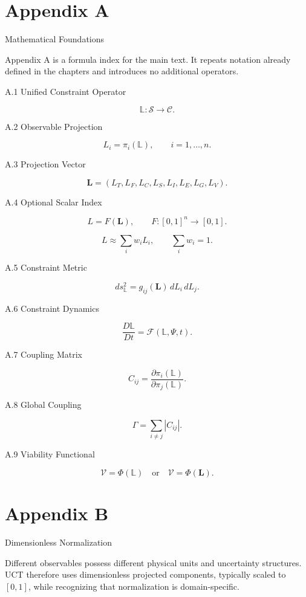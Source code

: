 ﻿\appendix

\section{Appendix A}

Mathematical Foundations

Appendix A is a formula index for the main text. It repeats notation already defined in the chapters and introduces no additional operators.

A.1 Unified Constraint Operator

\[ \mathbb{L}:\mathcal{S}\rightarrow\mathcal{C}. \]

A.2 Observable Projection

\[ L_i=\pi_i(\mathbb{L}), \qquad i=1,\ldots,n. \]

A.3 Projection Vector

\[ \mathbf{L}=(L_T,L_F,L_C,L_S,L_I,L_E,L_G,L_V). \]

A.4 Optional Scalar Index

\[ L=F(\mathbf{L}), \qquad F:[0,1]^n\rightarrow[0,1]. \]

\[ L\approx\sum_i w_i L_i, \qquad \sum_i w_i=1. \]

A.5 Constraint Metric

\[ ds_{\mathbb{L}}^2=g_{ij}(\mathbf{L})\,dL_i\,dL_j. \]

A.6 Constraint Dynamics

\[ \frac{D\mathbb{L}}{Dt}=\mathcal{F}(\mathbb{L},\Psi,t). \]

A.7 Coupling Matrix

\[ C_{ij}=\frac{\partial \pi_i(\mathbb{L})}{\partial \pi_j(\mathbb{L})}. \]

A.8 Global Coupling

\[ \Gamma=\sum_{i\neq j}|C_{ij}|. \]

A.9 Viability Functional

\[ \mathcal{V}=\Phi(\mathbb{L}) \quad \text{or} \quad \mathcal{V}=\Phi(\mathbf{L}). \]

\section{Appendix B}

Dimensionless Normalization

Different observables possess different physical units and uncertainty structures. UCT therefore uses dimensionless projected components, typically scaled to \([0,1]\), while recognizing that normalization is domain-specific.

